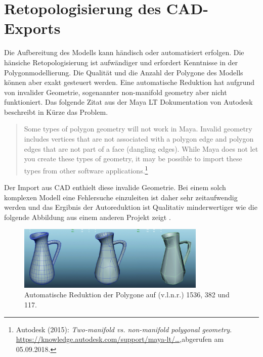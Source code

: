 \label{sec:RetopologisierungDesCAD-Exports}
\section{Retopologisierung des CAD-Exports}
Die Aufbereitung des Modells kann händisch oder automatisiert erfolgen. Die hänsiche Retopologisierung ist aufwändiger und erfordert Kenntnisse in der Polygonmodellierung. Die Qualität und die Anzahl der Polygone des Modells können aber exakt gesteuert werden. Eine automatische Reduktion hat aufgrund von invalider Geometrie, sogenannter non-manifold geometry aber nicht funktioniert. Das folgende Zitat aus der Maya LT Dokumentation von Autodesk beschreibt in Kürze das Problem. 

\begin{quote}
\glqq Some types of polygon geometry will not work in Maya. Invalid geometry includes vertices that are not associated with a polygon edge and polygon edges that are not part of a face (dangling edges). While Maya does not let you create these types of geometry, it may be possible to import these types from other software applications.\grqq\footnote{Autodesk  (2015): \textit{Two-manifold vs. non-manifold polygonal geometry}.\newline
\href{https://knowledge.autodesk.com/support/maya-lt/learn-explore/caas/CloudHelp/cloudhelp/2015/ENU/MayaLT/files/Polygons-overview-Twomanifold-vs--nonmanifold-polygonal-geometry-htm.html}{https://knowledge.autodesk.com/support/maya-lt/\dots},\newline abgerufen am 05.09.2018.} 
\end{quote}

Der Import aus CAD enthielt diese invalide Geometrie. Bei einem solch komplexen Modell eine Fehlersuche einzuleiten ist daher sehr zeitaufwendig werden und das Ergibnis der Autoreduktion ist Qualitativ minderwertiger wie die folgende Abbildung aus einem anderen Projekt zeigt . 

\begin{figure}[H]
	\centering
	\captionsetup{width=0.8\textwidth}
	\includegraphics[keepaspectratio, width=0.8\textwidth]{bildquellen/hp-zu-lp-automatisch}
	\caption{Automatische Reduktion der Polygone auf (v.l.n.r.) 1536, 382 und 117.}
	\label{fig:2.4}
\end{figure}

